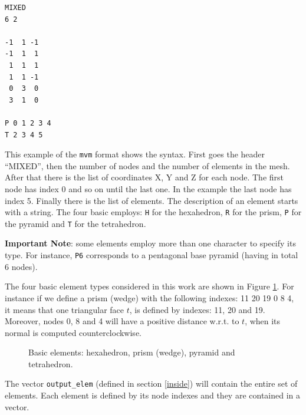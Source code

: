 \documentclass[10pt]{article}
\begin{document}
\begin{minipage}{0.2\textwidth}
\begin{verbatim}
MIXED
6 2

-1  1 -1
-1  1  1
 1  1  1
 1  1 -1
 0  3  0
 3  1  0

P 0 1 2 3 4
T 2 3 4 5
\end{verbatim}
\vspace{.3cm}
\end{minipage}
\hfill
\begin{minipage}[c]{0.78\textwidth}
This example of the \texttt{mvm} format shows the syntax. First goes the header ``MIXED'', then the number of nodes and the number of elements in the mesh. After that there is the list of coordinates X, Y and Z for each node. The first node has index 0 and so on until the last one. In the example the last node has index 5. Finally there is the list of elements. The description of an element starts with a string. The four basic employs: \texttt{H} for the hexahedron, \texttt{R} for the prism, \texttt{P} for the pyramid and \texttt{T} for the tetrahedron. 

\textbf{Important Note}: some elements employ more than one character to specify its type. For instance, \texttt{P6} corresponds to a pentagonal base pyramid (having in total 6 nodes).
\end{minipage}

The four basic element types considered in this work are shown in Figure \ref{elementsNumbering}. For instance if we define a prism (wedge) with the following indexes: 11 20 19 0 8 4, it means that one triangular face $t$, is defined by indexes: 11, 20 and 19. Moreover, nodes 0, 8 and 4 will have a positive distance w.r.t. to $t$, when its normal is computed  counterclockwise. 
 
 \begin{figure}[htb]
\centering
\caption{Basic elements:  hexahedron,  prism (wedge),  pyramid and  tetrahedron.}
\label{elementsNumbering}
\end{figure}
 
The vector \texttt{output\_elem} (defined in section \ref{inside}) will contain the entire set of elements. Each element is defined by its node indexes and they are contained in a vector.
 
\end{document}
